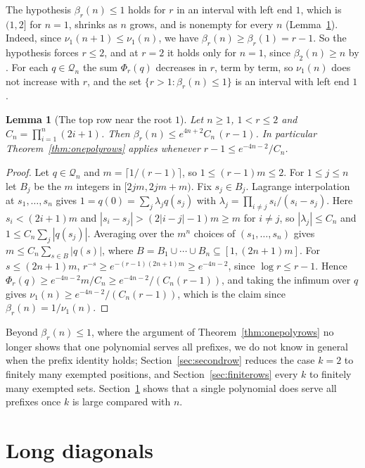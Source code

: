 \documentclass[11pt]{article}
\newtheorem{lemma}[theorem]{Lemma}
\begin{document}
The hypothesis $\beta_r(n)\le1$ holds for $r$ in an interval with left end
$1$, which is $(1,2]$ for $n=1$, shrinks as $n$ grows, and is nonempty for
every $n$ (Lemma~\ref{lem:topnearone}).  Indeed, since
$\nu_1(n+1)\le\nu_1(n)$, we have $\beta_r(n)\ge\beta_r(1)=r-1$.  So the
hypothesis forces $r\le2$, and at $r=2$ it holds only for $n=1$, since
$\beta_2(n)\ge n$ by \cite[Theorem~5.9]{coefficient-mass}.  For each
$q\in\mathcal Q_n$ the sum $\Phi_r(q)$ decreases in $r$, term by term, so
$\nu_1(n)$ does not increase with $r$, and the set
$\{r>1:\beta_r(n)\le1\}$ is an interval with left end $1$.

\begin{lemma}[The top row near the root $1$]\label{lem:topnearone}
Let $n\ge1$, $1<r\le2$ and $C_n=\prod_{i=1}^n(2i+1)$.  Then
$\beta_r(n)\le e^{4n+2}C_n\,(r-1)$.  In particular Theorem~\ref{thm:onepolyrows}
applies whenever $r-1\le e^{-4n-2}/C_n$.
\end{lemma}

\begin{proof}
Let $q\in\mathcal Q_n$ and $m=\lceil1/(r-1)\rceil$, so $1\le(r-1)m\le2$.
For $1\le j\le n$ let $B_j$ be the $m$ integers in $[2jm,2jm+m)$.  Fix
$s_j\in B_j$.  Lagrange interpolation at $s_1,\ldots,s_n$ gives
$1=q(0)=\sum_j\lambda_jq(s_j)$ with
$\lambda_j=\prod_{i\ne j}s_i/(s_i-s_j)$.  Here $s_i<(2i+1)m$ and
$|s_i-s_j|>(2|i-j|-1)m\ge m$ for $i\ne j$, so $|\lambda_j|\le C_n$ and
$1\le C_n\sum_j|q(s_j)|$.  Averaging over the $m^n$ choices of
$(s_1,\ldots,s_n)$ gives $m\le C_n\sum_{s\in B}|q(s)|$, where
$B=B_1\cup\cdots\cup B_n\subseteq[1,(2n+1)m]$.  For $s\le(2n+1)m$,
$r^{-s}\ge e^{-(r-1)(2n+1)m}\ge e^{-4n-2}$, since $\log r\le r-1$.  Hence
$\Phi_r(q)\ge e^{-4n-2}m/C_n\ge e^{-4n-2}/(C_n(r-1))$, and taking the
infimum over $q$ gives $\nu_1(n)\ge e^{-4n-2}/(C_n(r-1))$, which is the
claim since $\beta_r(n)=1/\nu_1(n)$.
\end{proof}

Beyond $\beta_r(n)\le1$, where the argument of Theorem~\ref{thm:onepolyrows}
no longer shows that one polynomial serves all prefixes,
we do not know in general when the prefix identity holds;
Section~\ref{sec:secondrow} reduces the case $k=2$ to finitely many exempted
positions, and Section~\ref{sec:finiterows} every $k$ to finitely many
exempted sets.  Section~\ref{sec:longdiag} shows that a
single polynomial does serve all prefixes once $k$ is large compared with
$n$.

\section{Long diagonals}\label{sec:longdiag}
\end{document}
